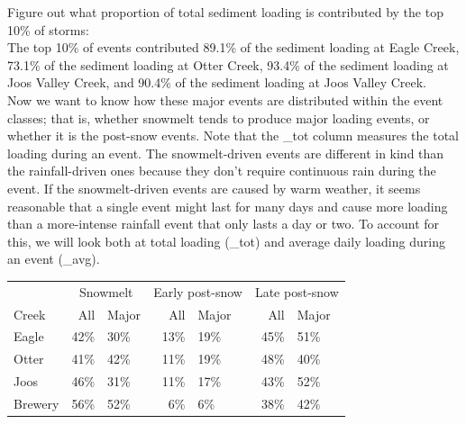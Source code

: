 \documentclass[12pt]{article}
\begin{document}
Figure out what proportion of total sediment loading is contributed by the top 10\% of storms:\\








The top 10\% of events contributed 89.1\% of the sediment loading at Eagle Creek, 73.1\% of the sediment loading at Otter Creek, 93.4\% of the sediment loading at Joos Valley Creek, and 90.4\% of the sediment loading at Joos Valley Creek.\\

Now we want to know how these major events are distributed within the event classes; that is, whether snowmelt tends to produce major loading events, or whether it is the post-snow events. Note that the \_tot column measures the total loading during an event. The snowmelt-driven events are different in kind than the rainfall-driven ones because they don't require continuous rain during the event. If the snowmelt-driven events are caused by warm weather, it seems reasonable that a single event might last for many days and cause more loading than a more-intense rainfall event that only lasts a day or two. To account for this, we will look both at total loading (\_tot) and average daily loading during an event (\_avg).\\


\begin{table}[h]
    \begin{center}
    \begin{tabular}{lr|lr|lr|l}
        & \multicolumn{2}{c}{Snowmelt    }\ & \multicolumn{2}{c}{Early post-snow}\ & \multicolumn{2}{c}{Late post-snow} \\
        Creek & All & Major & All & Major & All & Major \\
        \hline 
        Eagle & 42\% & 30\% & 13\% & 19\% & 45\% & 51\% \\
        Otter & 41\% & 42\% & 11\% & 19\% & 48\% & 40\% \\
        Joos & 46\% & 31\% & 11\% & 17\% & 43\% & 52\% \\
        
        Brewery & 56\% & 52\% & 6\% & 6\% & 38\% & 42\% \\
        
    \end{tabular}
    \end{center}
\end{table}
\end{document}
